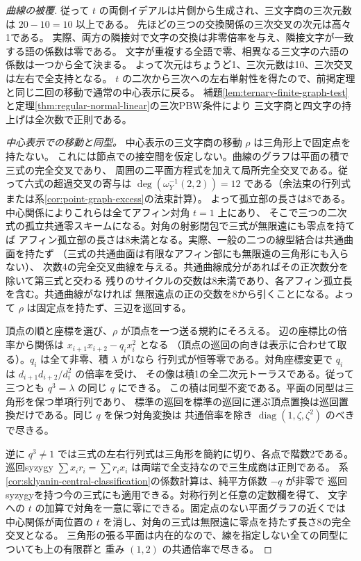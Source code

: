 \begin{proof}[曲線の被覆]
従って $t$ の両側イデアルは片側から生成され、三文字商の三次元数は $20-10=10$ 以上である。
先ほどの三つの交換関係の三次交叉の次元は高々1である。
実際、両方の隣接対で文字の交換は非零倍率を与え、隣接文字が一致する語の係数は零である。
文字が重複する全語で零、相異なる三文字の六語の係数は一つから全て決まる。
よって次元はちょうど1、三次元数は10、三次交叉は左右で全支持となる。
$t$ の二次から三次への左右単射性を得たので、前掲定理と同じ二回の移動で通常の中心表示に戻る。
補題\ref{lem:ternary-finite-graph-test}と定理\ref{thm:regular-normal-linear}の三次PBW条件により
三文字商と四文字の持上げは全次数で正則である。

\smallskip
\noindent\textit{中心表示での移動と同型。}
中心表示の三文字商の移動 $\rho$ は三角形上で固定点を持たない。
これには節点での接空間を仮定しない。曲線のグラフは平面の積で三式の完全交叉であり、
周囲の二平面方程式を加えて局所完全交叉である。従って六式の超過交叉の寄与は
$\deg(\omega_Y^{-1}(2,2))=12$ である（余法束の行列式または系\ref{cor:point-graph-excess}の法束計算）。
よって孤立部の長さは8である。中心関係によりこれらは全てアフィン対角 $t=1$ 上にあり、
そこで三つの二次式の孤立共通零スキームになる。対角の射影閉包で三式が無限遠にも零点を持てば
アフィン孤立部の長さは8未満となる。実際、一般の二つの線型結合は共通曲面を持たず
（三式の共通曲面は有限なアフィン部にも無限遠の三角形にも入らない）、
次数4の完全交叉曲線を与える。共通曲線成分があればその正次数分を除いて第三式と交わる
残りのサイクルの交数は8未満であり、各アフィン孤立長を含む。共通曲線がなければ
無限遠点の正の交数を8から引くことになる。よって $\rho$ は固定点を持たず、三辺を巡回する。

頂点の順と座標を選び、$\rho$ が頂点を一つ送る規約にそろえる。
辺の座標比の倍率から関係は $x_{i+1}x_{i+2}-q_i x_i^2$ となる
（頂点の巡回の向きは表示に合わせて取る）。$q_i$ は全て非零、積 $\lambda$ が1なら
行列式が恒等零である。対角座標変更で $q_i$ は $d_{i+1}d_{i+2}/d_i^2$ の倍率を受け、
その像は積1の全二次元トーラスである。従って三つとも $q^3=\lambda$ の同じ $q$ にできる。
この積は同型不変である。平面の同型は三角形を保つ単項行列であり、
標準の巡回を標準の巡回に運ぶ頂点置換は巡回置換だけである。同じ $q$ を保つ対角変換は
共通倍率を除き $\operatorname{diag}(1,\zeta,\zeta^2)$ のべきで尽きる。

逆に $q^3\ne1$ では三式の左右行列式は三角形を簡約に切り、各点で階数2である。
巡回syzygy $\sum x_i r_i=\sum r_i x_i$ は両端で全支持なので三生成商は正則である。
系\ref{cor:sklyanin-central-classification}の係数計算は、純平方係数 $-q$ が非零で
巡回syzygyを持つ今の三式にも適用できる。対称行列と任意の定数欄を得て、
文字への $t$ の加算で対角を一意に零にできる。固定点のない平面グラフの近くでは
中心関係が両位置の $t$ を消し、対角の三式は無限遠に零点を持たず長さ8の完全交叉となる。
三角形の張る平面は内在的なので、線を指定しない全ての同型についても上の有限群と
重み $(1,2)$ の共通倍率で尽きる。


\end{proof}
